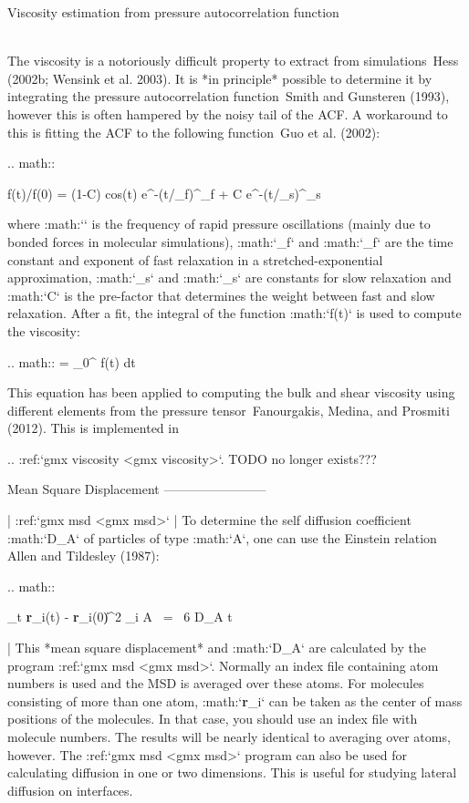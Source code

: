 Viscosity estimation from pressure autocorrelation function
~~~~~~~~~~~~~~~~~~~~~~~~~~~~~~~~~~~~~~~~~~~~~~~~~~~~~~~~~~~

The viscosity is a notoriously difficult property to extract from
simulations Hess (2002b; Wensink et al. 2003). It is *in principle*
possible to determine it by integrating the pressure autocorrelation
function Smith and Gunsteren (1993), however this is often hampered by
the noisy tail of the ACF. A workaround to this is fitting the ACF to
the following function Guo et al. (2002):

.. math::

   f(t)/f(0) = (1-C) {\rm cos}(\omega t) e^{-(t/\tau_f)^{\beta_f}} + C
   e^{-(t/\tau_s)^{\beta_s}}

where :math:`\omega` is the frequency of rapid pressure oscillations
(mainly due to bonded forces in molecular simulations), :math:`\tau_f`
and :math:`\beta_f` are the time constant and exponent of fast
relaxation in a stretched-exponential approximation, :math:`\tau_s` and
:math:`\beta_s` are constants for slow relaxation and :math:`C` is the
pre-factor that determines the weight between fast and slow relaxation.
After a fit, the integral of the function :math:`f(t)` is used to
compute the viscosity:

.. math:: \eta = \int_0^{\infty} f(t) dt

This equation has been applied to computing the bulk and shear
viscosity using different elements from the pressure tensor Fanourgakis,
Medina, and Prosmiti (2012). This is implemented in


.. :ref:`gmx viscosity <gmx viscosity>`. TODO no longer exists???

Mean Square Displacement
------------------------

| :ref:`gmx msd <gmx msd>`
| To determine the self diffusion
  coefficient :math:`D_A` of
  particles of type :math:`A`, one can use the Einstein
  relation Allen and Tildesley (1987):

  .. math::

     \lim_{t \rightarrow \infty} \langle
     \|{\bf r}_i(t) - {\bf r}_i(0)\|^2 \rangle_{i \in A} ~=~ 6 D_A t

| This *mean square displacement* and :math:`D_A` are calculated by the
  program :ref:`gmx msd <gmx msd>`. Normally
  an index file containing atom numbers is used and the MSD is averaged
  over these atoms. For molecules consisting of more than one atom,
  :math:`{\bf r}_i` can be taken as the center of mass positions of the
  molecules. In that case, you should use an index file with molecule
  numbers. The results will be nearly identical to averaging over atoms,
  however. The :ref:`gmx msd <gmx msd>` program can also be used for
  calculating diffusion in one or two dimensions. This is useful for
  studying lateral diffusion on interfaces.

